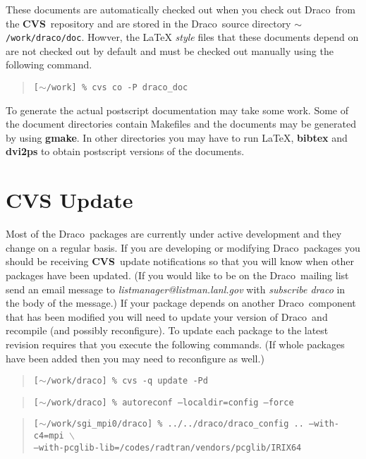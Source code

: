 \documentclass[11pt]{nmemo}
\newcommand{\comp}[1]{\normalfont\footnotesize\texttt{#1}\normalsize}
\newcommand{\draco}{{\normalfont\sffamily Draco}}
\newcommand{\cvs}{{\normalfont\bfseries CVS}}
\begin{document}
These documents are automatically checked out when you check out
\draco\ from the \cvs\ repository and are stored in the \draco\ source
directory \comp{$\sim$/work/draco/doc}.  Howver, the \LaTeX
\emph{style} files that these documents depend on are not checked out
by default and must be checked out manually using the following
command.

\footnotesize
\begin{quote}
\texttt{[$\sim$/work] \% cvs co -P draco\_doc}
\end{quote}
\normalsize

To generate the actual postscript documentation may take some work.
Some of the document directories contain Makefiles and the documents
may be generated by using \textbf{gmake}.  In other directories you
may have to run \LaTeX, \textbf{bibtex} and \textbf{dvi2ps} to obtain
postscript versions of the documents.

\section{CVS Update}

Most of the \draco\ packages are currently under active development
and they change on a regular basis.  If you are developing or
modifying \draco\ packages you should be receiving \cvs\ update
notifications so that you will know when other packages have been
updated.  (If you would like to be on the \draco\ mailing list send an
email message to \emph{listmanager@listman.lanl.gov} with
\emph{subscribe draco} in the body of the message.)  If your package
depends on another \draco\ component that has been modified you will
need to update your version of \draco\ and recompile (and possibly
reconfigure).  To update each package to the latest revision requires
that you execute the following commands.  (If whole packages have been
added then you may need to reconfigure as well.)

\footnotesize
\begin{verse}
\texttt{[$\sim$/work/draco] \% cvs -q update -Pd}
\end{verse}

\begin{verse}
\texttt{[$\sim$/work/draco] \% autoreconf --localdir=config --force}
\end{verse}

\begin{verse}
\texttt{[$\sim$/work/sgi\_mpi0/draco] \% ../../draco/draco\_config
.. --with-c4=mpi $\backslash$ \\
\hspace{0.5in}--with-pcglib-lib=/codes/radtran/vendors/pcglib/IRIX64}
\end{verse}
\end{document}
